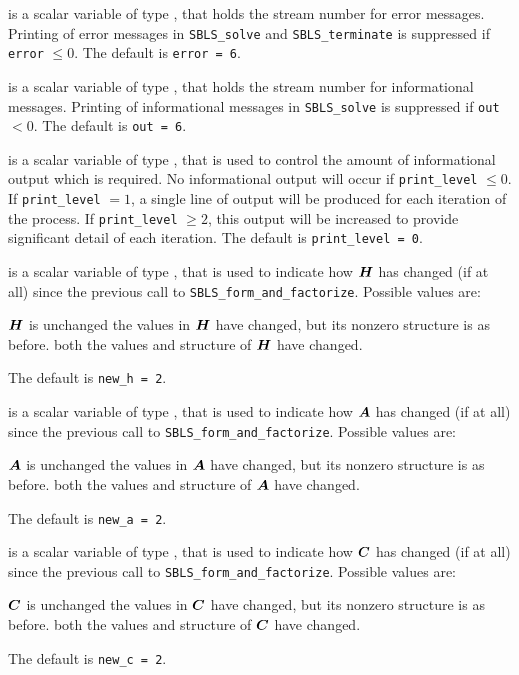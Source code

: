 \documentclass{galahad}
\newcommand{\packagename}{SBLS}
\begin{document}
\begin{description}

 is a scalar variable of type \integer, that holds the
stream number for error messages. Printing of error messages in
{\tt \packagename\_solve} and {\tt \packagename\_terminate}
is suppressed if {\tt error} $\leq 0$.
The default is {\tt error = 6}.

 is a scalar variable of type \integer, that holds the
stream number for informational messages. Printing of informational messages in
{\tt \packagename\_solve} is suppressed if {\tt out} $< 0$.
The default is {\tt out = 6}.

 is a scalar variable of type \integer, that is used
to control the amount of informational output which is required. No
informational output will occur if {\tt print\_level} $\leq 0$. If
{\tt print\_level} $= 1$, a single line of output will be produced for each
iteration of the process. If {\tt print\_level} $\geq 2$, this output will be
increased to provide significant detail of each iteration.
The default is {\tt print\_level = 0}.

 is a scalar variable of type \integer, that is used
to indicate how ${\bm{H}}$ has changed (if at all) since the previous call
to {\tt SBLS\_form\_and\_factorize}. Possible values are:
\begin{description}
 ${\bm{H}}$ is unchanged
 the values in ${\bm{H}}$ have changed, but its nonzero structure
is as before.
 both the values and structure of ${\bm{H}}$ have changed.
\end{description}
The default is {\tt new\_h = 2}.

 is a scalar variable of type \integer, that is used
to indicate how ${\bm{A}}$ has changed (if at all) since the previous call
to {\tt SBLS\_form\_and\_factorize}. Possible values are:
\begin{description}
 ${\bm{A}}$ is unchanged
 the values in ${\bm{A}}$ have changed, but its nonzero structure
is as before.
 both the values and structure of ${\bm{A}}$ have changed.
\end{description}
The default is {\tt new\_a = 2}.

 is a scalar variable of type \integer, that is used
to indicate how ${\bm{C}}$ has changed (if at all) since the previous call
to {\tt SBLS\_form\_and\_factorize}. Possible values are:
\begin{description}
 ${\bm{C}}$ is unchanged
 the values in ${\bm{C}}$ have changed, but its nonzero structure
is as before.
 both the values and structure of ${\bm{C}}$ have changed.
\end{description}
The default is {\tt new\_c = 2}.


\end{description}
\end{document}
